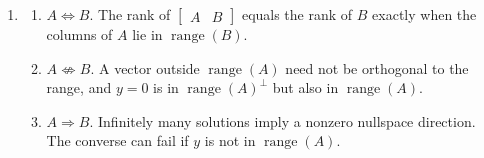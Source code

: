 \begin{enumerate}[label=\textbf{\arabic*.}]
    \item
    \begin{enumerate}[label=(\alph*)]
        \item \(A\Leftrightarrow B\). The rank of \(\begin{bmatrix}A&B\end{bmatrix}\)
        equals the rank of \(B\) exactly when the columns of \(A\) lie in
        \(\operatorname{range}(B)\).
        \item \(A\not\Leftrightarrow B\). A vector outside
        \(\operatorname{range}(A)\) need not be orthogonal to the range,
        and \(y=0\) is in \(\operatorname{range}(A)^\perp\) but also in
        \(\operatorname{range}(A)\).
        \item \(A\Rightarrow B\). Infinitely many solutions imply a
        nonzero nullspace direction. The converse can fail if \(y\) is
        not in \(\operatorname{range}(A)\).
    \end{enumerate}


\end{enumerate}
